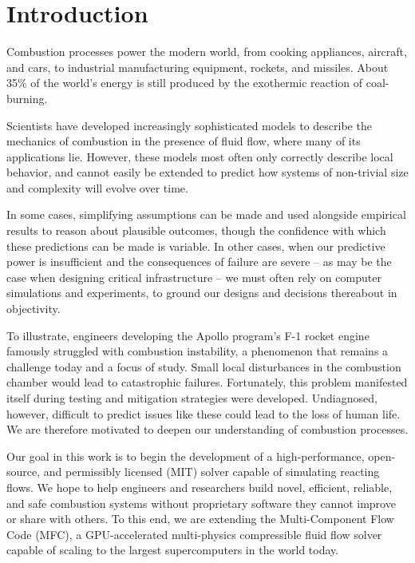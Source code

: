 \chapter{Introduction}
\label{ch:introduction}

Combustion processes power the modern world, from cooking appliances, aircraft,
and cars, to industrial manufacturing equipment, rockets, and missiles. About 35\%
of the world's energy is still produced by the exothermic reaction of coal-burning.

Scientists have developed increasingly sophisticated models to describe the mechanics
of combustion in the presence of fluid flow, where many of its applications lie.
However, these models most often only correctly describe local behavior, and cannot
easily be extended to predict how systems of non-trivial size and complexity will
evolve over time.

In some cases, simplifying assumptions can be made and used alongside
empirical results to reason about plausible outcomes, though the confidence with
which these predictions can be made is variable. In other cases, when our predictive
power is insufficient and the consequences of failure are severe -- as may be the case
when designing critical infrastructure -- we must often rely on computer simulations
and experiments, to ground our designs and decisions thereabout in objectivity.

To illustrate, engineers developing the Apollo program's F-1 rocket engine famously
struggled with combustion instability, a phenomenon that remains a challenge today
and a focus of study. Small local disturbances in the combustion chamber would
lead to catastrophic failures. Fortunately, this problem manifested itself during
testing and mitigation strategies were developed. Undiagnosed, however, difficult
to predict issues like these could lead to the loss of human life. We are therefore
motivated to deepen our understanding of combustion processes.

Our goal in this work is to begin the development of a high-performance, open-source,
and permissibly licensed (MIT) solver capable of simulating reacting flows.
We hope to help engineers and researchers build novel, efficient, reliable, and
safe combustion systems without proprietary software they cannot improve or share
with others. To this end, we are extending the Multi-Component Flow Code (MFC),
a GPU-accelerated multi-physics compressible fluid flow solver capable of scaling
to the largest supercomputers in the world today.
